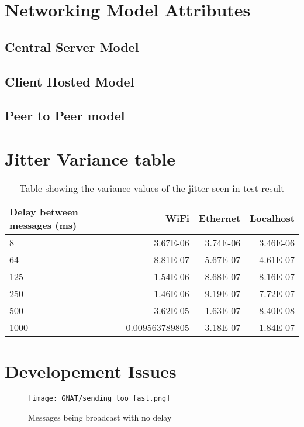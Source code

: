 \chapter{Networking Model Attributes}\label{app:attributes}

\section{Central Server Model}

\newpage

\section{Client Hosted Model}

\newpage

\section{Peer to Peer model}


\chapter{Jitter Variance table}

\begin{table}[!h]
  \centering
  \begin{tabular}{ l r r r }
    \toprule
    Delay between messages (ms) & WiFi & Ethernet & Localhost \\
    \midrule

     8     & 3.67E-06       & 3.74E-06 & 3.46E-06 \\
     64    & 8.81E-07       & 5.67E-07 & 4.61E-07 \\
     125   & 1.54E-06       & 8.68E-07 & 8.16E-07 \\
     250   & 1.46E-06       & 9.19E-07 & 7.72E-07 \\
     500   & 3.62E-05       & 1.63E-07 & 8.40E-08 \\
     1000  & 0.009563789805 & 3.18E-07 & 1.84E-07 \\

    \bottomrule
  \end{tabular}
  \caption{Table showing the variance values of the jitter seen in test result}
  \label{table:var_table}
\end{table}


\chapter{Developement Issues}
\begin{figure}[!h]
  \centering
  \texttt{[image: GNAT/sending\_too\_fast.png]}
  \caption{Messages being broadcast with no delay}
  \label{fig:broadcast_too_fast}
\end{figure}

